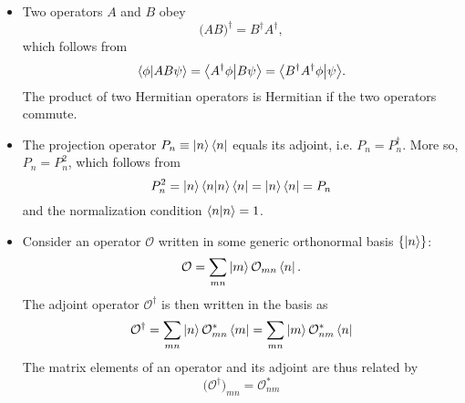 \documentclass[11pt, a4paper]{article}
\newcommand{\Herm}{Hermitian\xspace}
\renewcommand{\O}{\mathcal{O}}  %
\newcommand{\p}{\psi}  %
\newcommand{\bbraket}[2]{\big \langle {#1} \big | {#2} \big \rangle}  %
\begin{document}
\begin{itemize}
	\item Two operators $ A $ and $ B $ obey
	\begin{equation*}
		\big(AB\big)^{\dagger} = B^{\dagger}A^{\dagger},
	\end{equation*}
	which follows from
	\begin{equation*}
		\braket{\phi}{AB\p} = \bbraket{A^{\dagger}\phi}{B\p} = \bbraket{B^{\dagger}A^{\dagger}\phi}{\p}.
	\end{equation*}
	The product of two \Herm operators is \Herm if the two operators commute.
	
	\item The projection operator $ P_{n} \equiv \ket{n}\bra{n} $ equals its adjoint, i.e. $ P_{n} = P_{n}^{\dagger} $. More so, $ P_{n} = P_{n}^{2} $, which follows from
	\begin{equation*}
		P_{n}^{2} = \ket{n}\bra{n} \ket{n}\bra{n} = \ket{n}\bra{n} = P_{n}
	\end{equation*}
	and the normalization condition $ \braket{n}{n} = 1 $.
	
	\item Consider an operator $ \O $ written in some generic orthonormal basis $ \{\ket{n}\} $:
	\begin{equation*}
		\O = \sum_{mn} \ket{m}\O_{mn}\bra{n}.
	\end{equation*}
	The adjoint operator $ \O^{\dagger} $ is then written in the basis as
	\begin{equation*}
		\O^{\dagger} = \sum_{mn}\ket{n}\O_{mn}^{*}\bra{m} = \sum_{mn}\ket{m} \O_{nm}^{*}\bra{n}
	\end{equation*}
	The matrix elements of an operator and its adjoint are thus related by
	\begin{equation*}
		\big(\O^{\dagger}\big)_{mn} = \O_{nm}^{*}
	\end{equation*}
\end{itemize}
\end{document}

